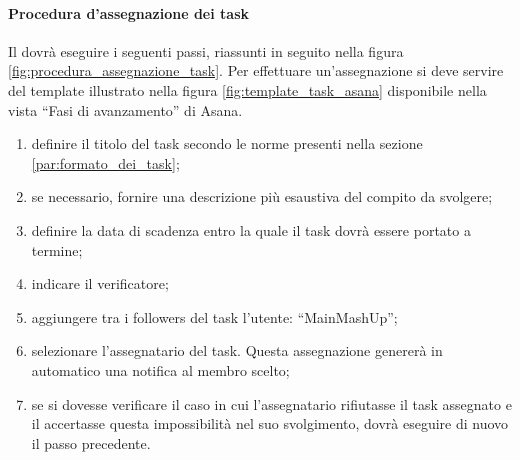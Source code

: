 			\paragraph{Procedura d'assegnazione dei task}
			\label{par:procedura_assegnazione_task}
			Il \roleProjectManager{} dovrà eseguire i seguenti passi, riassunti in seguito nella figura \ref{fig:procedura_assegnazione_task}. \newline
			Per effettuare un'assegnazione si deve servire del template illustrato nella figura \ref{fig:template_task_asana} disponibile nella vista ``Fasi di avanzamento'' di Asana.
				\begin{enumerate}
					\item definire il titolo del task secondo le norme presenti nella sezione \ref{par:formato_dei_task};
					\item se necessario, fornire una descrizione più esaustiva del compito da svolgere;
					\item definire la data di scadenza entro la quale il task dovrà essere portato a termine;
					\item indicare il verificatore;
					\item aggiungere tra i followers del task l'utente: ``MainMashUp'';
					\item selezionare l'assegnatario del task. Questa assegnazione genererà in automatico una notifica al membro scelto;
					\item se si dovesse verificare il caso in cui l'assegnatario rifiutasse il task assegnato e il \roleProjectManager{} accertasse questa impossibilità nel suo svolgimento, dovrà eseguire di nuovo il passo precedente. 
				\end{enumerate}
